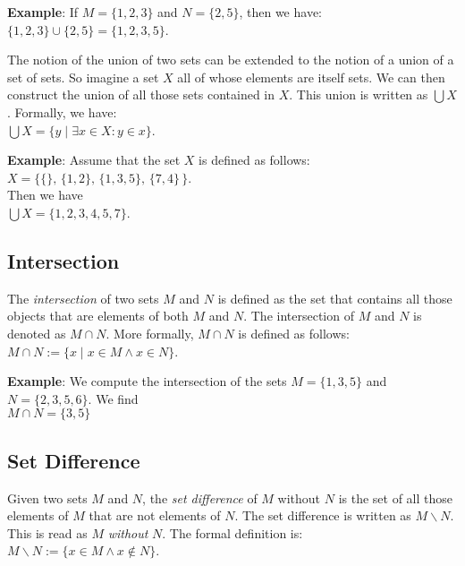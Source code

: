 \noindent
\textbf{Example}: 
If  $M = \{1,2,3\}$ and $N = \{2,5\}$, then we have: \\[0.2cm]
\hspace*{1.3cm} $\{1,2,3\} \cup \{2,5\} = \{1,2,3,5\}$. 
\vspace{0.2cm}

The notion of the union of two sets can be extended to the notion of a union of a set of
sets.  So imagine a set $X$ all of whose elements are itself sets.
We can then construct the union of all those sets contained in $X$.
This union is written as $\bigcup X$.  Formally, we have: \\[0.2cm]
\hspace*{1.3cm} $\bigcup X = \{ y \;|\; \exists x \in X: y \in x \}$.
\vspace{0.2cm}

\noindent
\textbf{Example}: 
Assume that the set $X$ is defined as follows: \\[0.2cm]
\hspace*{1.3cm} $X = \big\{ \{\},\, \{1,2\}, \, \{1,3,5\}, \, \{7,4\}\,\big\}$. \\[0.2cm]
Then we have \\[0.2cm]
\hspace*{1.3cm} $\bigcup X = \{ 1, 2, 3, 4, 5, 7 \}$.

\subsection{Intersection}
The \emph{intersection} of two sets  $M$ and $N$ is defined as the set that contains all those
objects that are elements of both $M$ and $N$.  The intersection of $M$ and $N$ is denoted
as $M \cap N$.  More formally,  $M \cap N$ is defined as follows: \\[0.2cm]
\hspace*{1.3cm} $M \cap N := \{ x \mid x \in M \wedge x \in N \}$. 
\vspace{0.2cm}

\noindent
\textbf{Example}: 
We compute the intersection of the sets $M = \{ 1, 3, 5 \}$ and $N = \{ 2, 3, 5, 6 \}$.
We find
\\[0.2cm]
\hspace*{1.3cm} $M \cap N = \{ 3, 5 \}$

\subsection{Set Difference}
Given two sets $M$ and $N$, the  \emph{set difference} of 
 $M$ without $N$ is the set of all those elements of  $M$ that are not elements of $N$.  
The set difference is written as $M \backslash N$.  This is read as $M$ \emph{without} $N$.
The formal definition is: \\[0.2cm]
\hspace*{1.3cm} $M \backslash N := \{ x \in M \wedge x \not\in N \}$. 
\vspace{0.2cm}

